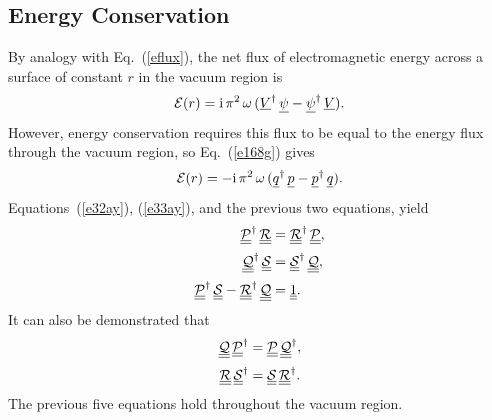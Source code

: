 \documentclass[12pt,prb,aps]{revtex4-1}
\begin{document}
\subsection{Energy Conservation}
By analogy with Eq.~(\ref{eflux}), the net flux of electromagnetic energy across a surface of constant $r$ in the vacuum region is
\begin{equation}
{\cal E}(r) = {\rm i}\,\pi^2\,\omega\, (\underline{V}^\dag\,\underline{\psi}- \underline{\psi}^\dag\,\underline{V}).
\end{equation}
However, energy conservation requires this flux to be equal  to the energy flux through the vacuum region, so Eq.~(\ref{e168g}) gives
\begin{equation}\label{e39x}
{\cal E}(r) =-  {\rm i}\,\pi^2\,\omega\,(\underline{q}^\dag\,\underline{p}-\underline{p}^\dag\,\underline{q}).
\end{equation}
Equations~(\ref{e32ay}), (\ref{e33ay}), and the previous two equations, yield\,\cite{tj1}
\begin{align}\label{e41zx}
\underline{\underline{\cal P}}^\dag\,\underline{\underline{\cal R}}&= \underline{\underline{\cal R}}^\dag\,\underline{\underline{\cal P}},\\[0.5ex]
\underline{\underline{\cal Q}}^\dag\,\underline{\underline{\cal S}}&= \underline{\underline{\cal S}}^\dag\,\underline{\underline{\cal Q}},\label{e42zx}\\[0.5ex]
\underline{\underline{\cal P}}^\dag\,\underline{\underline{\cal S}}- \underline{\underline{\cal R}}^\dag\,\underline{\underline{\cal Q}}&=\underline{\underline{1}}.\label{e43zx}
\end{align}
 It can also be demonstrated that 
\begin{align}\label{e46}
\underline{\underline{\cal Q}}\,\underline{\underline{\cal P}}^\dag&= \underline{\underline{\cal P}}\,\underline{\underline{\cal Q}}^\dag,\\[0.5ex]
\underline{\underline{\cal R}}\,\underline{\underline{\cal S}}^\dag&= \underline{\underline{\cal S}}\,\underline{\underline{\cal R}}^\dag.\label{e47x}
\end{align}
The previous five equations hold throughout the vacuum region. 
\end{document}

